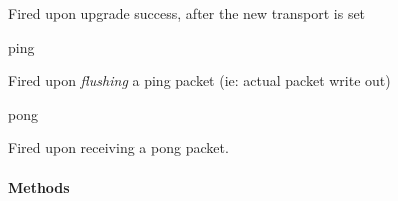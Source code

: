 \begin{DoxyItemize}
\begin{DoxyItemize}
\item Fired upon upgrade success, after the new transport is set
\end{DoxyItemize}
\item {\ttfamily ping}
\begin{DoxyItemize}
\item Fired upon {\itshape flushing} a ping packet (ie\+: actual packet write out)
\end{DoxyItemize}
\item {\ttfamily pong}
\begin{DoxyItemize}
\item Fired upon receiving a pong packet.
\end{DoxyItemize}
\end{DoxyItemize}

\paragraph*{Methods}


